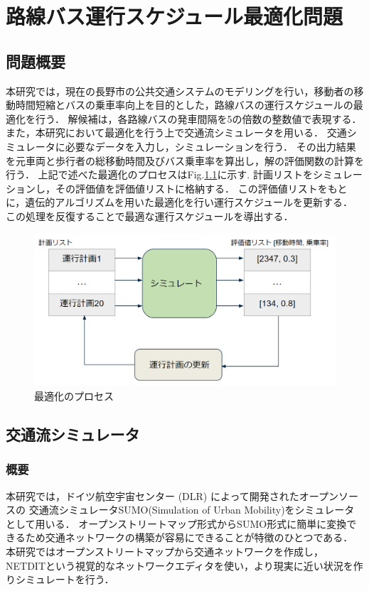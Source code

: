 \documentclass[main]{subfiles}
\begin{document}
    \chapter{路線バス運行スケジュール最適化問題}
    \section{問題概要}
    本研究では，現在の長野市の公共交通システムのモデリングを行い，移動者の移動時間短縮とバスの乗車率向上を目的とした，路線バスの運行スケジュールの最適化を行う．
    解候補は，各路線バスの発車間隔を5の倍数の整数値で表現する．また，本研究において最適化を行う上で交通流シミュレータを用いる．
    交通シミュレータに必要なデータを入力し，シミュレーションを行う．
    その出力結果を元車両と歩行者の総移動時間及びバス乗車率を算出し，解の評価関数の計算を行う．
    上記で述べた最適化のプロセスはFig.\ref{algo}に示す.
    計画リストをシミュレーションし，その評価値を評価値リストに格納する．
    この評価値リストをもとに，遺伝的アルゴリズムを用いた最適化を行い運行スケジュールを更新する．
    この処理を反復することで最適な運行スケジュールを導出する．
    \begin{figure}
        \centering
        \includegraphics[width=\linewidth]{figures/algo.png}
        \caption{最適化のプロセス}
        \label{algo}
    \end{figure}

    \section{交通流シミュレータ}
        \subsection{概要}
        本研究では，ドイツ航空宇宙センター (DLR) によって開発されたオープンソースの
        交通流シミュレータSUMO(Simulation of Urban Mobility)\cite{sumo}をシミュレータとして用いる．
        オープンストリートマップ形式からSUMO形式に簡単に変換できるため交通ネットワークの構築が容易にできることが特徴のひとつである．
        本研究ではオープンストリートマップから交通ネットワークを作成し，
        NETDITという視覚的なネットワークエディタを使い，より現実に近い状況を作りシミュレートを行う．
\end{document}
